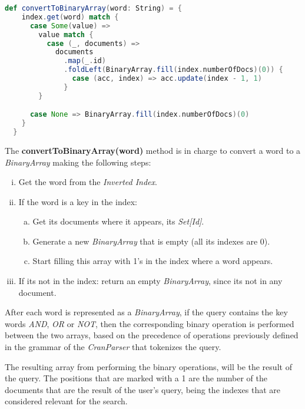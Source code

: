 \documentclass{article}
\begin{document}
\begin{lstlisting}[language=Scala]
def convertToBinaryArray(word: String) = {
    index.get(word) match {
      case Some(value) =>
        value match {
          case (_, documents) =>
            documents
              .map(_.id)
              .foldLeft(BinaryArray.fill(index.numberOfDocs)(0)) {                
                case (acc, index) => acc.update(index - 1, 1)
              }
        }

      case None => BinaryArray.fill(index.numberOfDocs)(0)
    }
  }
\end{lstlisting}

The \textbf{convertToBinaryArray(word)} method is in charge to convert a word to a \textit{BinaryArray} making the following steps:

\begin{enumerate}[(i)]
	\item Get the word from the \textit{Inverted Index}.
	\item If the word is a key in the index:
	\begin{enumerate}[(a)]
		\item Get its documents where it appears, its \textit{Set[Id]}.
		\item Generate a new \textit{BinaryArray} that is empty (all its indexes are 0).
		\item Start filling this array with 1's in the index where a word appears.
	\end{enumerate}
	\item If its not in the index: return an empty \textit{BinaryArray}, since its not in any document.
\end{enumerate}

After each word is represented as a \textit{BinaryArray}, if the query contains the key words \textit{AND}, \textit{OR} or \textit{NOT}, then the corresponding binary operation is performed between the two arrays, based on the precedence of operations previously defined in the grammar of the \textit{CranParser} that tokenizes the query.

The resulting array from performing the binary operations, will be the result of the query. The positions that are marked with a 1 are the number of the documents that are the result of the user's query, being the indexes that are considered relevant for the search.

\end{document}
